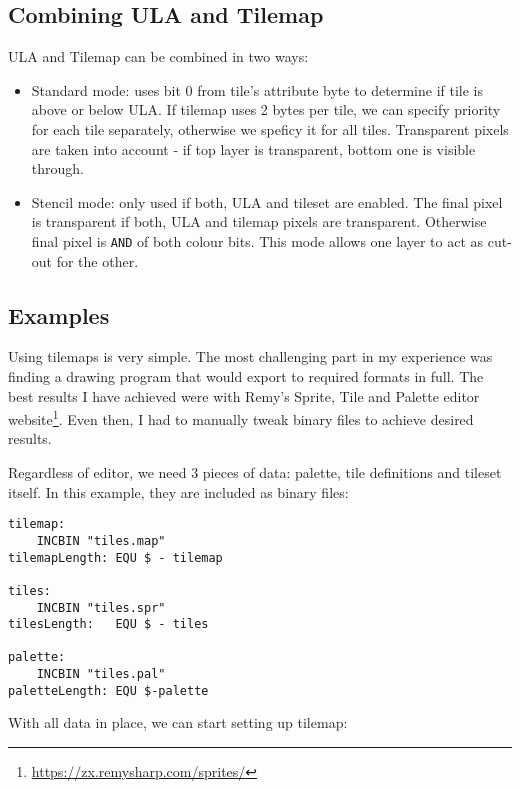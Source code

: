 \documentclass[12pt,twoside,openright,a4paper]{book}
\begin{document}
\pagebreak
\subsection{Combining ULA and Tilemap}

ULA and Tilemap can be combined in two ways:

\begin{itemize}[topsep=1pt,itemsep=1pt]
	\item Standard mode: uses bit 0 from tile's attribute byte to determine if tile is above or below ULA. If tilemap uses 2 bytes per tile, we can specify priority for each tile separately, otherwise we speficy it for all tiles. Transparent pixels are taken into account - if top layer is transparent, bottom one is visible through.
	
	\item Stencil mode: only used if both, ULA and tileset are enabled. The final pixel is transparent if both, ULA and tilemap pixels are transparent. Otherwise final pixel is {\tt AND} of both colour bits. This mode allows one layer to act as cut-out for the other.
\end{itemize}


\subsection{Examples}

Using tilemaps is very simple. The most challenging part in my experience was finding a drawing program that would export to required formats in full. The best results I have achieved were with Remy's Sprite, Tile and Palette editor website\footnote{\url{https://zx.remysharp.com/sprites/}}. Even then, I had to manually tweak binary files to achieve desired results.

Regardless of editor, we need 3 pieces of data: palette, tile definitions and tileset itself. In this example, they are included as binary files:

\begin{Verbatim}
tilemap:
	INCBIN "tiles.map"
tilemapLength: EQU $ - tilemap

tiles:
	INCBIN "tiles.spr"
tilesLength:   EQU $ - tiles

palette:
	INCBIN "tiles.pal"
paletteLength: EQU $-palette
\end{Verbatim}

With all data in place, we can start setting up tilemap:
\end{document}
